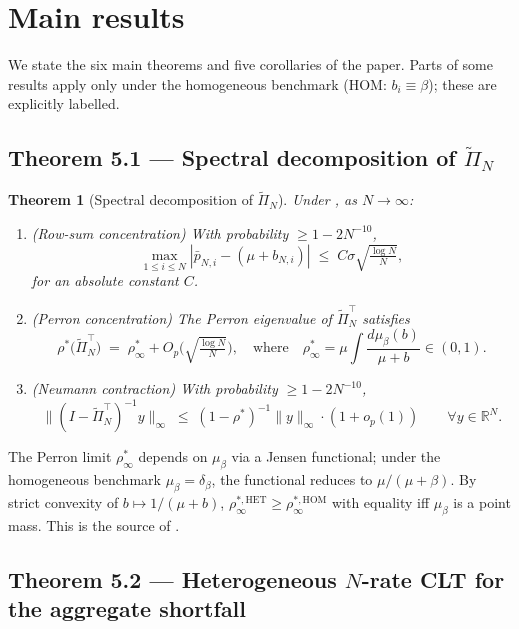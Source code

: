 \documentclass[11pt,a4paper]{article}
\newtheorem{theorem}{Theorem}[section]
\theoremstyle{definition}
\newcommand{\rhoStar}{\rho^\ast}
\newcommand{\rhoInf}{\rho_\infty^\ast}
\newcommand{\HOM}{\mathrm{HOM}}
\newcommand{\HET}{\mathrm{HET}}
\begin{document}
\section{Main results}
\label{sec:main}

We state the six main theorems and five corollaries of the paper. Parts of
some results apply only under the homogeneous benchmark (HOM: $b_i\equiv\beta$);
these are explicitly labelled.

\subsection{Theorem 5.1 --- Spectral decomposition of $\widetilde\Pi_N$}

\begin{theorem}[Spectral decomposition of $\widetilde\Pi_N$]
\label{thm:thm51}
Under , as $N\to\infty$:
\begin{enumerate}[leftmargin=1.5em]
\item {\rm(Row-sum concentration)} With probability $\geq 1 - 2N^{-10}$,
\[
\max_{1\leq i\leq N}\left|\bar p_{N,i} - (\mu + b_{N,i})\right|\;\leq\;C\sigma\sqrt{\tfrac{\log N}{N}},
\]
for an absolute constant $C$.
\item {\rm(Perron concentration)} The Perron eigenvalue of
$\widetilde\Pi_N^\top$ satisfies
\[
\rhoStar\bigl(\widetilde\Pi_N^\top\bigr)\;=\;
\rhoInf + O_p\bigl(\sqrt{\tfrac{\log N}{N}}\bigr),
\quad\text{where}\quad
\rhoInf = \mu\int\frac{d\mu_\beta(b)}{\mu+b}\in(0,1).
\]
\item {\rm(Neumann contraction)} With probability $\geq 1 - 2N^{-10}$,
\[
\bigl\|(I - \widetilde\Pi_N^\top)^{-1}y\bigr\|_\infty\;\leq\;
(1 - \rhoStar)^{-1}\|y\|_\infty\cdot(1 + o_p(1))\qquad\forall y\in\mathbb{R}^N.
\]
\end{enumerate}
\end{theorem}

The Perron limit $\rhoInf$ depends on $\mu_\beta$ via a Jensen functional;
under the homogeneous benchmark $\mu_\beta = \delta_\beta$, the functional
reduces to $\mu/(\mu+\beta)$. By strict convexity of $b\mapsto 1/(\mu+b)$,
$\rho_\infty^{\ast,\HET}\geq\rho_\infty^{\ast,\HOM}$ with equality iff $\mu_\beta$ is a point mass.
This is the source of .

\subsection{Theorem 5.2 --- Heterogeneous $N$-rate CLT for the aggregate shortfall}
\end{document}
